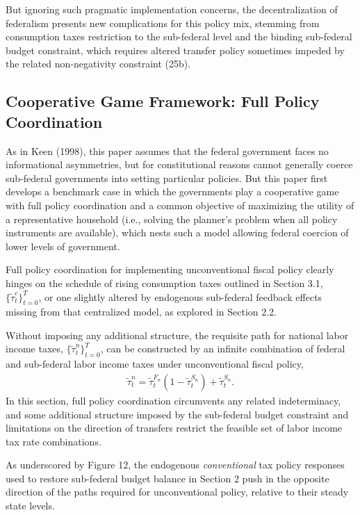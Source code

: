 \documentclass[12pt,letterpaper]{article}
\begin{document}
But ignoring such pragmatic implementation concerns, the decentralization of federalism presents new complications for this policy mix, stemming from consumption taxes restriction to the sub-federal level and the binding sub-federal budget constraint, which requires altered transfer policy sometimes impeded by the related non-negativity constraint (25b). 

\subsection{Cooperative Game Framework: Full Policy Coordination}

As in Keen (1998), this paper assumes that the federal government faces no informational asymmetries, but for constitutional reasons cannot generally coerce sub-federal governments into setting particular policies. But this paper first develops a benchmark case in which the governments play a cooperative game with full policy coordination and a common objective of maximizing the utility of a representative household (i.e., solving the planner's problem when all policy instruments are available), which nests such a model allowing federal coercion of lower levels of government.  

Full policy coordination for implementing unconventional fiscal policy clearly hinges on the schedule of rising consumption taxes outlined in Section 3.1, $\{ \tilde{\tau}_t^c \}_{t=0}^{T}$, or one slightly altered by endogenous sub-federal feedback effects missing from that centralized model, as explored in Section 2.2.

Without imposing any additional structure, the requisite path for national labor income taxes, $\{ \tilde{\tau}_t^n \}_{t=0}^{T}$, can be constructed by an infinite combination of federal and sub-federal labor income taxes under unconventional fiscal policy, 
\begin{align} \tilde{\tau}_t^n =  \tilde{\tau}^{F_n}_t (1 -  \tilde{\tau}^{S_n}_t) + \tilde{\tau}^{S_n}_t.
\end{align} 
In this section, full policy coordination circumvents any related indeterminacy, and some additional structure imposed by the sub-federal budget constraint and limitations on the direction of transfers restrict the feasible set of labor income tax rate combinations. 

As underscored by Figure 12, the endogenous \textit{conventional} tax policy responses used to restore sub-federal budget balance in Section 2 push in the opposite direction of the paths required for unconventional policy, relative to their steady state levels.
\end{document}
